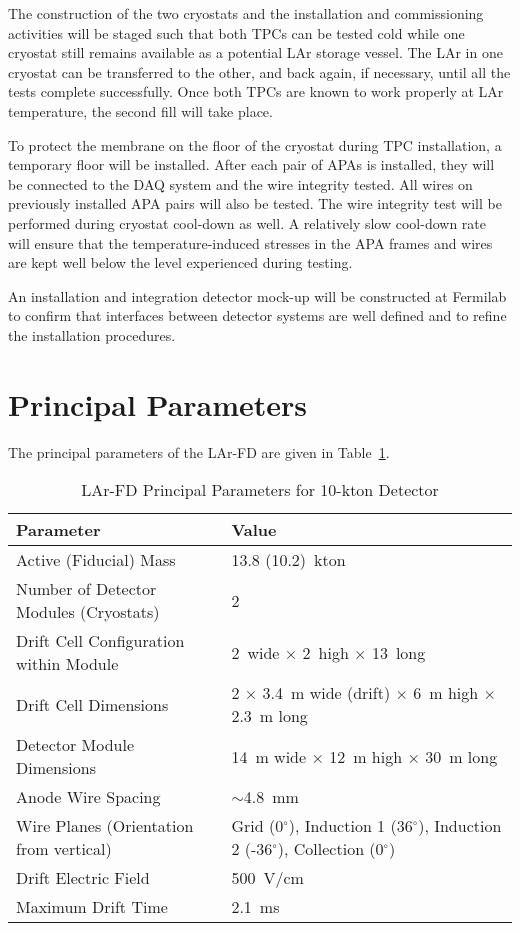 The construction of the two cryostats and the installation and commissioning activities will
be staged such that both TPCs can be tested cold while one cryostat still remains available
as a potential LAr storage vessel. The LAr in one cryostat can be transferred to the other, and
back again, if necessary, until all the tests complete successfully. Once both TPCs are known to work properly at LAr temperature, the second fill will take place.

To protect the membrane on the floor of the cryostat during TPC installation, a temporary floor will be installed. 
After each pair of APAs is installed, they will be connected to the DAQ system and the wire integrity tested. All wires on previously installed APA pairs will also be tested. The wire integrity test will be performed during cryostat cool-down as well. A relatively slow cool-down rate will ensure that the temperature-induced stresses in the APA frames and wires are kept well below the level experienced during testing. 

An installation and integration detector mock-up will be constructed at Fermilab to confirm that interfaces between detector systems are well defined and to refine the installation procedures. 


\section{Principal Parameters}

The principal parameters of the LAr-FD are given in Table~\ref{table:param-summ-larfd}. 

\begin{table}[htpb]
\caption{LAr-FD Principal Parameters for 10-kton Detector}
\label{table:param-summ-larfd}
\centering
 \begin{tabular}[htbp]{|l|| p{6cm} |}
\hline
Parameter & Value  \\
\hline\hline
Active (Fiducial) Mass &   13.8 (10.2)~kton \\
\hline
Number of Detector Modules (Cryostats) &  2 \\
\hline
Drift Cell Configuration within Module &  2~wide $\times$ 2~high $\times$ 13~long \\
\hline
Drift Cell Dimensions  &  2 $\times$ 3.4~m wide (drift) $\times$ 6~m high $\times$ 2.3~m long \\
\hline
Detector Module Dimensions &  14~m wide $\times$ 12~m high $\times$  30~m long \\
\hline
Anode Wire Spacing &  $\sim$4.8~mm \\
\hline
Wire Planes (Orientation from vertical) & Grid (0$^\circ$), Induction 1 (36$^\circ$), Induction 2 (-36$^\circ$), Collection (0$^\circ$) \\
\hline
Drift Electric Field &  500~V/cm \\ 
\hline
Maximum Drift Time & 2.1~ms \\
\hline
\end{tabular} 
\end{table}

